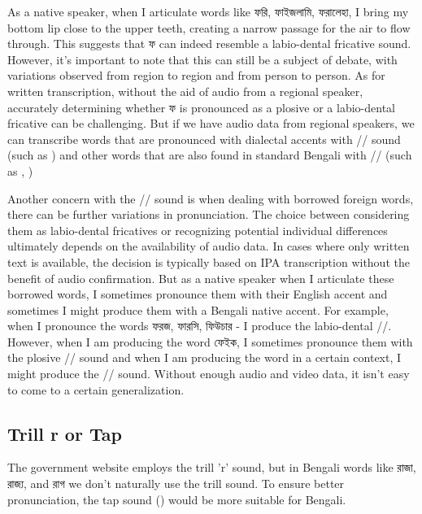As a native speaker, when I articulate words like \textbengali{ফরি, ফাইজলামি, ফরালেহা,} I bring my bottom lip close to the upper teeth, creating a narrow passage for the air to flow through. This suggests that ফ can indeed resemble a labio-dental fricative sound. However, it's important to note that this can still be a subject of debate, with variations observed from region to region and from person to person. As for written transcription, without the aid of audio from a regional speaker, accurately determining whether \textbengali{ফ} is pronounced as a plosive or a labio-dental fricative can be challenging. But if we have audio data from regional speakers, we can transcribe words that are pronounced with dialectal accents with // sound (such as ) and other words that are also found in standard Bengali with // (such as , )

Another concern with the // sound is when dealing with borrowed foreign words, there can be further variations in pronunciation. The choice between considering them as labio-dental fricatives or recognizing potential individual differences ultimately depends on the availability of audio data. In cases where only written text is available, the decision is typically based on IPA transcription without the benefit of audio confirmation. But as a native speaker when I articulate these borrowed words, I sometimes pronounce them with their English accent and sometimes I might produce them with a Bengali native accent. For example, when I pronounce the words \textbengali{ফরজ}, \textbengali{ফারসি}, \textbengali{ফিউচার} - I produce the labio-dental //. However, when I am producing the word \textbengali{ফেইক}, I sometimes pronounce them with the plosive // sound and when I am producing the word in a certain context, I might produce the // sound. Without enough audio and video data, 
it isn’t easy to come to a certain generalization. 

\subsection{Trill r or Tap }
The government website employs the trill 'r' sound, but in Bengali words like \textbengali{রাজা}, \textbengali{রাজ্য}, and \textbengali{রাগ} we don't naturally use the trill sound. To ensure better pronunciation, the tap sound () would be more suitable for Bengali.

